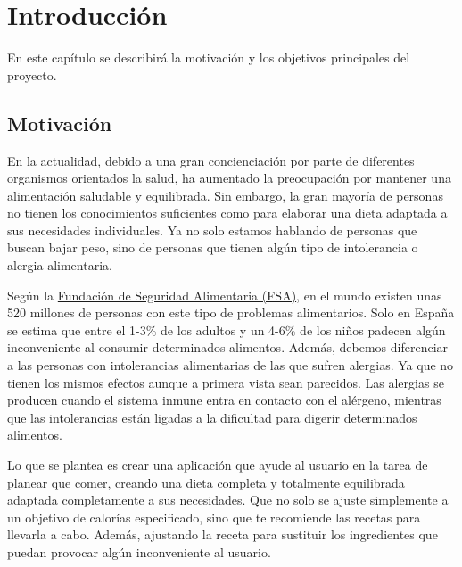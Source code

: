 \chapter{Introducción}
En este capítulo se describirá la motivación y los objetivos principales del proyecto.

\section{Motivación}
En la actualidad, debido a una gran concienciación por parte de diferentes organismos orientados la salud, ha aumentado la preocupación por mantener una alimentación saludable y equilibrada. Sin embargo, la gran mayoría de personas no tienen los conocimientos suficientes como para elaborar una dieta adaptada a sus necesidades individuales. Ya no solo estamos hablando de personas que buscan bajar peso, sino de personas que tienen algún tipo de intolerancia o alergia alimentaria. 

Según la \href{https://funsapa.org/alergia-alimentaria/incidencia/}{Fundación de Seguridad Alimentaria (FSA)}, en el mundo existen unas 520 millones de personas con este tipo de problemas alimentarios. Solo en España se estima que entre el 1-3\% de los adultos y un 4-6\% de los niños padecen algún inconveniente al consumir determinados alimentos. Además, debemos diferenciar a las personas con intolerancias alimentarias de las que sufren alergias. Ya que no tienen los mismos efectos aunque a primera vista sean parecidos. Las alergias se producen cuando el sistema inmune entra en contacto con el alérgeno, mientras que las intolerancias están ligadas a la dificultad para digerir determinados alimentos.

Lo que se plantea es crear una aplicación que ayude al usuario en la tarea de planear que comer, creando una dieta completa y totalmente equilibrada adaptada completamente a sus necesidades. Que no solo se ajuste simplemente a un objetivo de calorías especificado, sino que te recomiende las recetas para llevarla a cabo. Además, ajustando la receta para sustituir los ingredientes que puedan provocar algún inconveniente al usuario.

